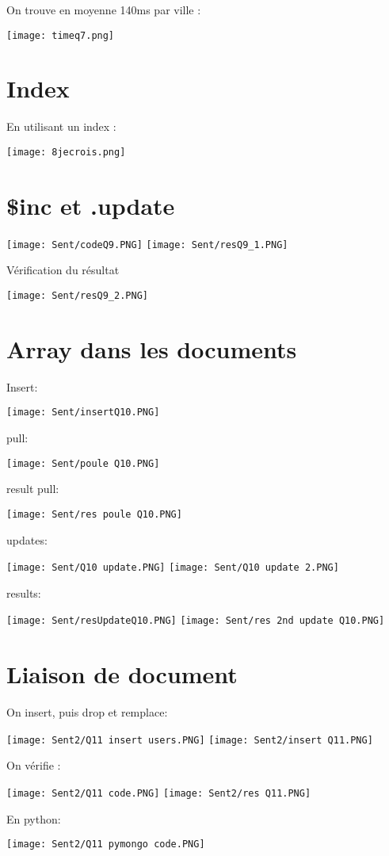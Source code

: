 \documentclass{article}
\begin{document}
On trouve en moyenne 140ms par ville :
\begin{center}
	\texttt{[image: timeq7.png]}
\end{center}

\section{Index}
En utilisant un index : 
\begin{center}
	\texttt{[image: 8jecrois.png]}
\end{center}

\section{\$inc et .update}
\begin{center}
	\texttt{[image: Sent/codeQ9.PNG]}
	\texttt{[image: Sent/resQ9\_1.PNG]}
\end{center}
Vérification du résultat
\begin{center}
	\texttt{[image: Sent/resQ9\_2.PNG]}
\end{center}

\pagebreak
\section{Array dans les documents}
Insert: 
\begin{center}
	\texttt{[image: Sent/insertQ10.PNG]}
\end{center}
pull:
\begin{center}
	\texttt{[image: Sent/poule Q10.PNG]}
\end{center}
	result pull:
\begin{center}
	\texttt{[image: Sent/res poule Q10.PNG]}
\end{center}
	updates:
\begin{center}
	\texttt{[image: Sent/Q10 update.PNG]}
	\texttt{[image: Sent/Q10 update 2.PNG]}
\end{center}
	results:
\begin{center}
	\texttt{[image: Sent/resUpdateQ10.PNG]}
	\texttt{[image: Sent/res 2nd update Q10.PNG]}
\end{center}

\section{Liaison de document}
On insert, puis drop et remplace:
\begin{center}
	\texttt{[image: Sent2/Q11 insert users.PNG]}
	\texttt{[image: Sent2/insert Q11.PNG]}
\end{center}
On vérifie :
\begin{center}
	\texttt{[image: Sent2/Q11 code.PNG]}
	\texttt{[image: Sent2/res Q11.PNG]}
\end{center}
\pagebreak
En python:
\begin{center}
	\texttt{[image: Sent2/Q11 pymongo code.PNG]}
\end{center}
\end{document}
